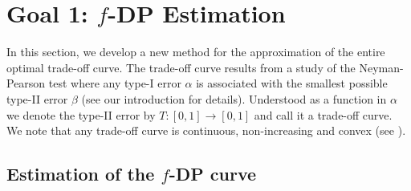 \section{Goal 1: $f$-DP Estimation} \label{sec:4}

In this section, we develop a new method for the approximation of the entire optimal trade-off curve. The trade-off curve results from a study of the Neyman-Pearson test where any type-I error $\alpha$ is associated with the smallest possible type-II error $\beta$ (see our introduction for details). Understood as a function in $\alpha$  we denote the type-II error by $T:[0,1] \to [0,1]$ and call it a trade-off curve. We note that any trade-off curve is continuous, non-increasing and convex (see \cite{Dong2022}).

\subsection{Estimation of the $f$-DP curve}

